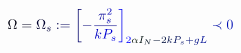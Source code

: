 \documentclass[12pt]{article}
\begin{document}
\makeatletter
\renewcommand*{\@textcolor}[3]{%
  \protect\leavevmode
  \begingroup
    \color#1{#2}#3%
  \endgroup
}
\makeatother
\begin{displaymath}
\mathcolor[RGB]{0,0,15}{\Omega} \mathcolor[RGB]{0,0,30}{=} \mathcolor[RGB]{0,0,45}{\Omega} _ { \mathcolor[RGB]{0,0,60}{s} } \mathcolor[RGB]{0,0,75}{:} \mathcolor[RGB]{0,0,90}{=} \mathcolor[RGB]{0,0,105}{\left[} \mathcolor[RGB]{0,0,120}{-} \mathcolor[RGB]{0,0,135}{\frac { \mathcolor[RGB]{0,0,150}{\pi} _ { \mathcolor[RGB]{0,0,165}{s} } ^ { \mathcolor[RGB]{0,0,180}{2} } } { \mathcolor[RGB]{0,0,195}{k} \mathcolor[RGB]{0,0,210}{P} _ { \mathcolor[RGB]{0,0,225}{s} } } } \mathcolor[RGB]{0,0,240}{\right]} _ { \mathcolor[RGB]{0,0,255}{2} \mathcolor[RGB]{0,15,0}{\alpha} \mathcolor[RGB]{0,15,15}{I} _ { \mathcolor[RGB]{0,15,30}{N} } \mathcolor[RGB]{0,15,45}{-} \mathcolor[RGB]{0,15,60}{2} \mathcolor[RGB]{0,15,75}{k} \mathcolor[RGB]{0,15,90}{P} _ { \mathcolor[RGB]{0,15,105}{s} } \mathcolor[RGB]{0,15,120}{+} \mathcolor[RGB]{0,15,135}{g} \mathcolor[RGB]{0,15,150}{L} } \mathcolor[RGB]{0,15,165}{\prec} \mathcolor[RGB]{0,15,180}{0}
\end{displaymath}
\end{document}
